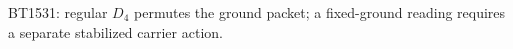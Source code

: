 \begin{center}\small
BT1531: regular $D_4$ permutes the ground packet; a fixed-ground reading requires a separate stabilized carrier action.
\end{center}
